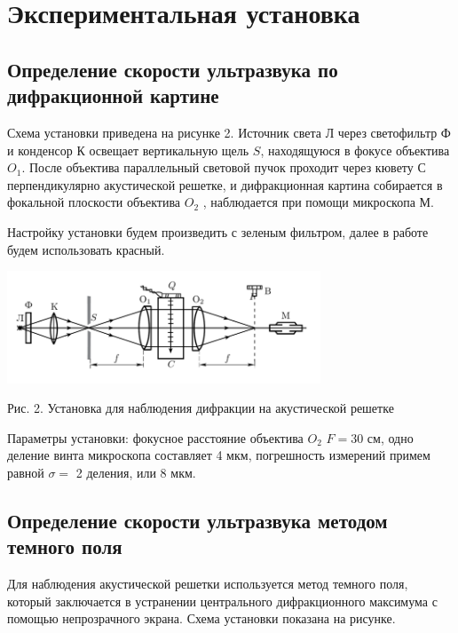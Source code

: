 \documentclass[a4paper,12pt]{article} %
\begin{document}
\section{Экспериментальная установка}

\subsection{Определение скорости ультразвука по дифракционной картине}

\noindent Схема установки приведена на рисунке 2. Источник света Л через светофильтр Ф и конденсор К освещает вертикальную щель $ S $, находящуюся в фокусе объектива $ O_1 $. После объектива параллельный световой пучок проходит через кювету С перпендикулярно акустической решетке, и дифракционная картина собирается в фокальной плоскости объектива $ O_2 $ , наблюдается при помощи микроскопа М.

\medskip

\noindent Настройку установки будем произведить с зеленым фильтром, далее в работе будем использовать красный.

\begin{center}
\includegraphics[width=0.7\textwidth]{2.png}

Рис. 2. Установка для наблюдения дифракции на акустической решетке
\label{shema1}
\end{center}

\noindent Параметры установки: фокусное расстояние объектива $  O_2  $ $ F = 30 $ см, одно деление винта микроскопа составляет 4 мкм, погрешность измерений примем равной  $ \sigma = $ 2 деления, или 8 мкм.

\subsection{Определение скорости ультразвука методом темного поля}

\noindent Для наблюдения акустической решетки используется метод темного поля, который заключается в устранении центрального дифракционного максимума с помощью непрозрачного экрана. Схема установки показана на рисунке.
\end{document}
